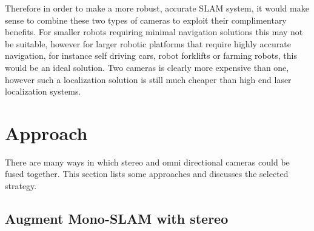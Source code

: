 Therefore in order to make a more robust, accurate SLAM system, it would make sense to combine these two types of cameras to exploit their complimentary benefits.  For smaller robots requiring minimal navigation solutions this may not be suitable, however for larger robotic platforms that require highly accurate navigation, for instance self driving cars, robot forklifts or farming robots, this would be an ideal solution.  Two cameras is clearly more expensive than one, however such a localization solution is still much cheaper than high end laser localization systems.

  

\section{Approach}

There are many ways in which stereo and omni directional cameras could be fused together.  This section lists some approaches and discusses the selected strategy.

\subsection{Augment Mono-SLAM with stereo}

